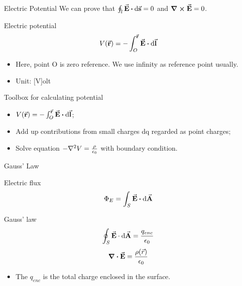 \documentclass{beamer}
\begin{document}
\begin{frame}{Electric Potential}
    We can prove that $\oint_l \va{E} \vdot \dd{\va{s}} = 0$ and $\curl{\va{E}} = 0$.

    \begin{block}{Electric potential}
        \begin{equation}
            V(\va{r}) = -\int_O^{\va{r}} \va{E} \vdot \dd{\va{l}}
        \end{equation}

        \begin{itemize}
            \item Here, point O is zero reference. We use infinity as reference point usually.
            \item Unit: [V]olt
        \end{itemize}	
    \end{block}

    \begin{block}{Toolbox for calculating potential}
        \begin{itemize}
            \item $V(\va{r}) = -\int_O^{\va{r}} \va{E} \vdot \dd{\va{l}}$;
            \item Add up contributions from small charges dq regarded as point charges;
            \item Solve equation $- \laplacian{V} = \frac{\rho}{\epsilon_0}$ with boundary condition.
        \end{itemize}
    \end{block}
\end{frame}


\begin{frame}{Gauss' Law}
	\begin{beamerboxesrounded}{Electric flux}
		\begin{equation}
			\Phi_E = \int_{S} \va{E} \vdot \dd{\va{A}}
		\end{equation}
	\end{beamerboxesrounded}
	\vspace{1em}
	\begin{beamerboxesrounded}{Gauss' law}
		\begin{equation}
			\oint_{S} \va{E} \cdot \dd{\va{A}} = \frac{q_{enc}}{\epsilon_0}
		\end{equation}
		\begin{equation}
			\div \va{E} = \frac{\rho(\vec{r})}{\epsilon_0}
		\end{equation}
	\end{beamerboxesrounded}
	\begin{itemize}
		\item The $q_{enc}$ is the total charge enclosed in the surface.
	\end{itemize}
\end{frame}
\end{document}
